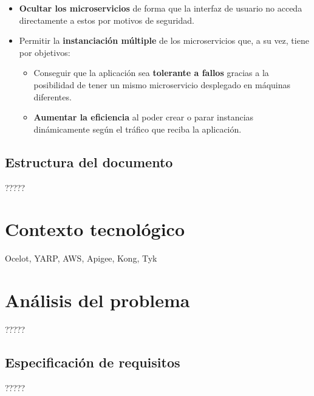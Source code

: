 \documentclass[11pt,spanish,listoffigures]{tfgetsinf}
\begin{document}
\begin{itemize}

	\item \textbf{Ocultar los microservicios} de forma que la interfaz de usuario no acceda directamente a estos por motivos de seguridad.
	
	\item Permitir la \textbf{instanciación múltiple} de los microservicios que, a su vez, tiene por objetivos:
		\begin{itemize}
		
			\item Conseguir que la aplicación sea \textbf{tolerante a fallos} gracias a la posibilidad de tener un mismo microservicio desplegado en máquinas diferentes.
			
			\item \textbf{Aumentar la eficiencia} al poder crear o parar instancias dinámicamente según el tráfico que reciba la aplicación.
			
		\end{itemize}

\end{itemize}

\section{Estructura del documento}

?????


\chapter{Contexto tecnológico}

Ocelot, YARP, AWS, Apigee, Kong, Tyk



\chapter{Análisis del problema}

?????

\section{Especificación de requisitos}

?????
\end{document}
